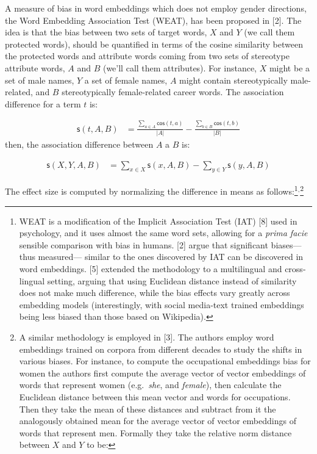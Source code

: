 \documentclass[
  10pt,
  dvipsnames,enabledeprecatedfontcommands]{scrartcl}
\begin{document}
A measure of bias in word embeddings which does not employ gender
directions, the Word Embedding Association Test (WEAT), has been
proposed in {[}2{]}. The idea is that the bias between two sets of
target words, \(X\) and \(Y\) (we call them protected words), should be
quantified in terms of the cosine similarity between the protected words
and attribute words coming from two sets of stereotype attribute words,
\(A\) and \(B\) (we'll call them attributes). For instance, \(X\) might
be a set of male names, \(Y\) a set of female names, \(A\) might contain
stereotypically male-related, and \(B\) stereotypically female-related
career words. The association difference for a term \(t\) is:

\vspace{-2mm}

\footnotesize

\begin{align}
\mathsf{s}(t,A,B) & = \frac{\sum_{a\in A}\mathsf{cos}(t,a)}{\vert A\vert} - \frac{\sum_{b\in B}\mathsf{cos}(t,b)}{\vert B\vert}
\end{align} \normalsize \noindent then, the association difference
between \(A\) a \(B\) is:

\vspace{-2mm}

\footnotesize

\begin{align}
\mathsf{s}(X,Y,A,B) & = \sum_{x\in X} \mathsf{s}(x,A,B) -  \sum_{y\in Y} \mathsf{s}(y,A,B)
\end{align} \normalsize

The effect size is computed by normalizing the difference in means as
follows:\footnote{ WEAT is a modification of the Implicit Association
  Test (IAT) {[}8{]} used in psychology, and it uses almost the same
  word sets, allowing for a \emph{prima facie} sensible comparison with
  bias in humans. {[}2{]} argue that significant biases---thus
  measured--- similar to the ones discovered by IAT can be discovered in
  word embeddings. {[}5{]} extended the methodology to a multilingual
  and cross-lingual setting, arguing that using Euclidean distance
  instead of similarity does not make much difference, while the bias
  effects vary greatly across embedding models (interestingly, with
  social media-text trained embeddings being less biased than those
  based on Wikipedia).}\(^{, }\)\footnote{ A similar methodology is
  employed in {[}3{]}. The authors employ word embeddings trained on
  corpora from different decades to study the shifts in various biases.
  For instance, to compute the occupational embeddings bias for women
  the authors first compute the average vector of vector embeddings of
  words that represent women (e.g.~\emph{she}, and \emph{female}), then
  calculate the Euclidean distance between this mean vector and words
  for occupations. Then they take the mean of these distances and
  subtract from it the analogously obtained mean for the average vector
  of vector embeddings of words that represent men. Formally they take
  the relative norm distance between \(X\) and \(Y\) to be:}
\end{document}
